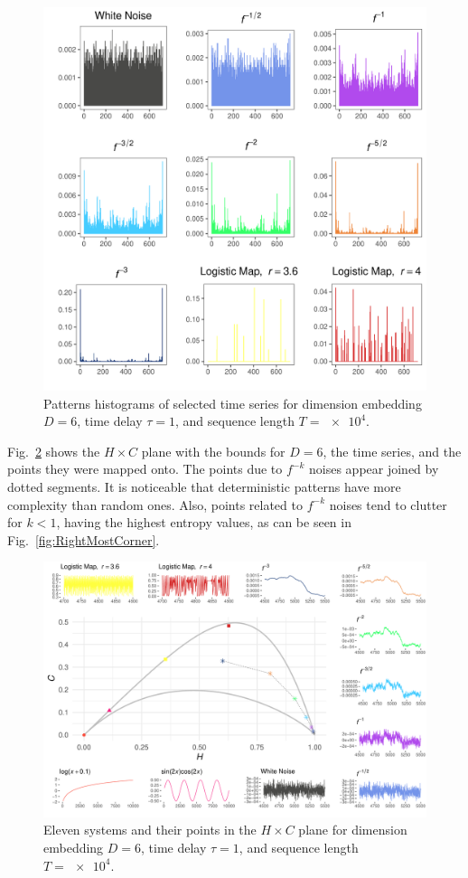 \documentclass[alpha-refs]{wiley-article}
\begin{document}
\begin{figure}[hbt]
\includegraphics[width=\linewidth]{Figures/h.pdf}
\caption{Patterns histograms of selected time series  for dimension embedding $D = 6$, time delay $\tau = 1$, and sequence length $T = \num[scientific-notation=true]{e4}$.}
\label{fig:Histograms}
\end{figure}

Fig.~\ref{fig:AllSystems} shows the $H\times C$ plane with the bounds for $D=6$, the time series, and the points they were mapped onto.
The points due to $f^{-k}$ noises appear joined by dotted segments.
It is noticeable that deterministic patterns have more complexity than random ones.
Also, points related to $f^{-k}$ noises tend to clutter for $k<1$, having the highest entropy values, as can be seen in Fig.~\ref{fig:RightMostCorner}.

\begin{figure}[hbt]
\centering
\includegraphics[width=\linewidth]{AllSystems}
\caption{Eleven systems and their points in the $H\times C$ plane for dimension embedding $D = 6$, time delay $\tau = 1$, and sequence length $T = \num[scientific-notation=true]{e4}$.}
\label{fig:AllSystems}
\end{figure}
\end{document}

